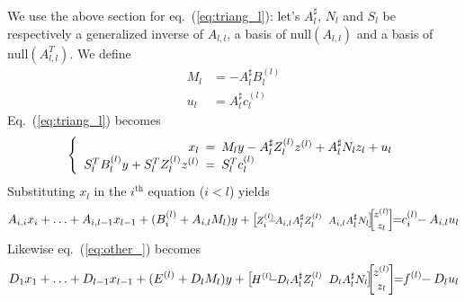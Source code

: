 \documentclass[]{article}
\theoremstyle{definition}
\newcommand{\BIN}{\begin{bmatrix}}
\newcommand{\BOUT}{\end{bmatrix}}
\begin{document}
We use the above section for eq.~(\ref{eq:triang_l}): let's $A_l^\sharp$, $N_l$ and $S_l$ be respectively a generalized inverse of $A_{l,l}$, a basis of $\mathrm{null}(A_{l,l})$ and a basis of $\mathrm{null}(A_{l,l}^T)$.
We define
\begin{align*}
	M_l &= -A_l^\sharp B_l^{(l)}\\
	u_l &= A_l^\sharp c_l^{(l)}
\end{align*}
Eq.~(\ref{eq:triang_l}) becomes
\begin{equation}
	\left\{ \begin{array}{rcl}
	x_l \hspace{-5pt}&=&\hspace{-5pt} M_l y -A_l^\sharp Z_l^{(l)} z^{(l)} + A_l^\sharp N_l z_l + u_l \\
	S_l^T B_l^{(l)} y + S_l^T Z_l^{(l)} z^{(l)} \hspace{-5pt}&=&\hspace{-5pt} S_l^T c_l^{(l)}
	\end{array}\right.
\end{equation}
Substituting $x_l$ in the $i^{\mathrm{th}}$ equation ($i<l$) yields
\begin{equation*}
\footnotesize
  A_{i,i} x_i + \ldots + A_{i,l-1} x_{l-1} + (B_i^{(l)} + A_{i,l} M_l)y 
	+ \BIN\hspace{-1pt} Z_i^{(l)} \hspace{-7pt}-\hspace{-3pt} A_{i,l} A_l^\sharp Z_l^{(l)} &\hspace{-5pt} A_{i,l} A_l^\sharp N_l\hspace{-1pt}\BOUT\hspace{-5pt} \BIN \hspace{-1pt}z^{(l)}\hspace{-1pt} \\ z_l \BOUT \hspace{-4pt}
	= \hspace{-3pt} c_i^{(l)} \hspace{-3pt}- A_{i,l} u_l
\end{equation*}
Likewise eq.~(\ref{eq:other_}) becomes
\begin{equation*}
\small
  D_1 x_ 1+ \ldots + D_{l-1} x_{l-1} + (E^{(l)} + D_l M_l)y 
	+ \BIN\hspace{-1pt} H^{(l)} \hspace{-5pt}-\hspace{-3pt} D_l A_l^\sharp Z_l^{(l)} &\hspace{-5pt} D_l A_l^\sharp N_l\hspace{-1pt}\BOUT\hspace{-5pt} \BIN \hspace{-1pt}z^{(l)}\hspace{-1pt} \\ z_l \BOUT \hspace{-4pt}
	= \hspace{-3pt} f^{(l)} \hspace{-3pt}- D_l u_l
\end{equation*}
\end{document}
